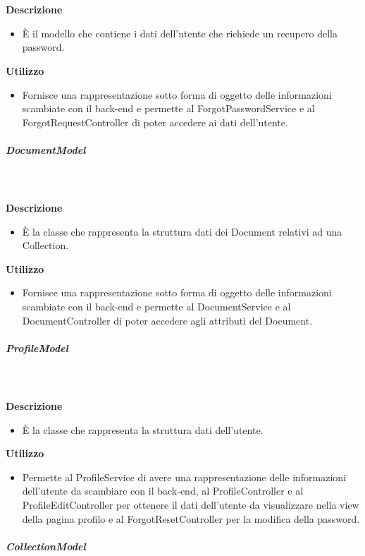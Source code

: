         \textbf{\\ \\ Descrizione} 
          \begin{itemize}
            \item[] È il modello che contiene i dati dell'utente che richiede un recupero della password.
          \end{itemize}      
        \textbf{Utilizzo}  
          \begin{itemize}
            \item[] Fornisce una rappresentazione sotto forma di oggetto delle informazioni scambiate con il back-end e permette al ForgotPasswordService e al ForgotRequestController di poter accedere ai dati dell'utente.
          \end{itemize}
      \subparagraph{DocumentModel}
        
        \textbf{\\ \\ Descrizione} 
          \begin{itemize}
            \item[] È la classe che rappresenta la struttura dati dei Document relativi ad una Collection.
          \end{itemize}      
        \textbf{Utilizzo}  
          \begin{itemize}
            \item[] Fornisce una rappresentazione sotto forma di oggetto delle informazioni scambiate con il back-end e permette al DocumentService e al DocumentController di poter accedere agli attributi del Document.
          \end{itemize}
      \subparagraph{ProfileModel}
        
        \textbf{\\ \\ Descrizione} 
          \begin{itemize}
            \item[] È la classe che rappresenta la struttura dati dell'utente.
          \end{itemize}      
        \textbf{Utilizzo}  
          \begin{itemize}
            \item[] Permette al ProfileService di avere una rappresentazione delle informazioni dell'utente da scambiare con il back-end, al ProfileController e al ProfileEditController per ottenere il dati dell'utente da visualizzare nella view della pagina profilo e al ForgotResetController per la modifica della password.
          \end{itemize}
      \subparagraph{CollectionModel}
        
